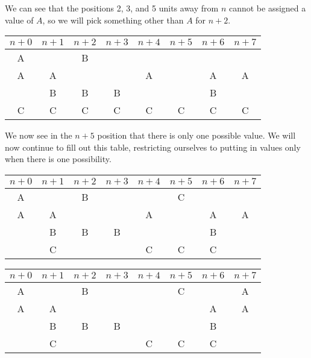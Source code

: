 \documentclass[12pt]{article}
\begin{document}
We can see that the positions 2, 3, and 5 units away from $n$ cannot be assigned a value of $A$, so we will pick something other than $A$ for $n+2$.
\begin{center}
    \begin{tabular}{|c|c|c|c|c|c|c|c|}
        \hline
        $n+0$ & $n+1$ & $n+2$ & $n+3$ & $n+4$ & $n+5$ & $n+6$ & $n+7$ \\
        \hline
        \rowcolor[RGB]{200, 200, 200}
        A & &\cellcolor{gray!70} B & & & & & \\
        \hline
        A & A &  &  & A &  & A & A \\
        \hline
        \cellcolor{gray!15} & B & B & B & \cellcolor{gray!15} & \cellcolor{gray!15} & B & \cellcolor{gray!15} \\
        \hline
        C & C & C & C & C & C & C & C \\
        \hline
    \end{tabular}
\end{center}

We now see in the $n+5$ position that there is only one possible value. We will now continue to fill out this table, restricting ourselves to putting in values only when there is one possibility.
\begin{center}
    \begin{tabular}{|c|c|c|c|c|c|c|c|}
        \hline
        $n+0$ & $n+1$ & $n+2$ & $n+3$ & $n+4$ & $n+5$ & $n+6$ & $n+7$ \\
        \hline
        \rowcolor[RGB]{200, 200, 200}
        A & & B & & &\cellcolor{gray!70} C & & \\
        \hline
        A & A &  &  & A &  & A & A \\
        \hline
         & B & B & B &  &  & B &  \\
        \hline
        \cellcolor{gray!15} & C & \cellcolor{gray!15} & \cellcolor{gray!15} & C & C & C & \cellcolor{gray!15} \\
        \hline
    \end{tabular}
\end{center}

\begin{center}
    \begin{tabular}{|c|c|c|c|c|c|c|c|}
        \hline
        $n+0$ & $n+1$ & $n+2$ & $n+3$ & $n+4$ & $n+5$ & $n+6$ & $n+7$ \\
        \hline
        \rowcolor[RGB]{200, 200, 200}
        A & & B & & & C & &\cellcolor{gray!70} A \\
        \hline
        A & A & \cellcolor{gray!15} &  & \cellcolor{gray!15} & \cellcolor{gray!15} & A & A \\
        \hline
         & B & B & B &  &  & B &  \\
        \hline
         & C &  &  & C & C & C &  \\
        \hline
    \end{tabular}
\end{center}
\end{document}
